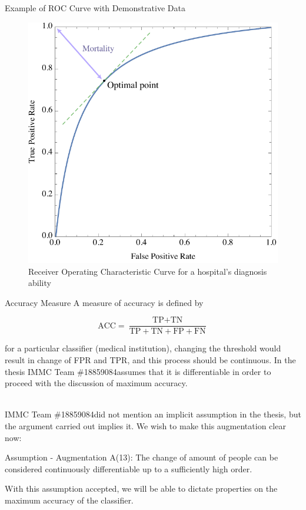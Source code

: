 \documentclass[8pt, hyperref={colorlinks=true}]{beamer}
\newcommand{\team}{IMMC Team \#18859084\hphantom{a}}
\begin{document}
\begin{frame}{Example of ROC Curve with Demonstrative Data}
\begin{figure}
    \centering
    \includegraphics[scale=.58]{ROC.pdf}
    \caption{Receiver Operating Characteristic Curve for a hospital's diagnosis ability}
    \label{fig:roc}
\end{figure}
\end{frame}

\begin{frame}{Accuracy Measure}
A measure of accuracy is defined by
\begin{definition}
\[
\text{ACC} = \frac{\text{TP} + \text{TN}}{\text{TP} + \text{TN} + \text{FP} + \text{FN}}
\]
\end{definition}
for a particular classifier (medical institution), changing the threshold would result in change of FPR and TPR, and this process should be continuous. In the thesis \team assumes that it is differentiable in order to proceed with the discussion of maximum accuracy.\\~\

\team did not mention an implicit assumption in the thesis, but the argument carried out implies it. We wish to make this augmentation clear now:
\begin{block}{Assumption - Augmentation}
A(13): The change of amount of people can be considered continuously differentiable up to a sufficiently high order.
\end{block}

With this assumption accepted, we will be able to dictate properties on the maximum accuracy of the classifier.
\end{frame}
\end{document}
